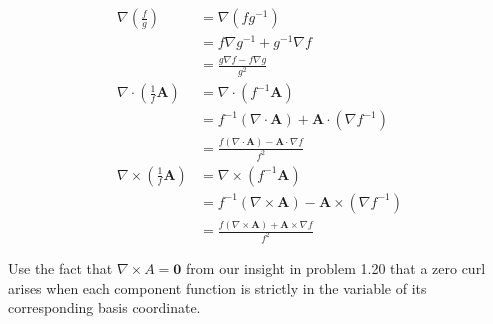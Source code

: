 \documentclass[a4paper]{article}
\begin{document}
\begin{align*}
	\nabla \!\left( \frac{f}{g} \right) & = \nabla \!\left( fg^{-1} \right) \\
					    & = f \nabla g^{-1} + g^{-1}\nabla f \\
					    & = \frac{g \nabla f - f \nabla g}{g^{2}} \\
	\nabla \cdot \!\left( \frac{1}{f} \pmb{A} \right) & = \nabla \cdot \!\left( f^{-1}\pmb{A} \right) \\
							  & = f^{-1}\!\left( \nabla \cdot \pmb{A} \right) + \pmb{A} \cdot \!\left( \nabla f^{-1} \right) \\
							  & = \frac{f \!\left( \nabla \cdot \pmb{A} \right) - \pmb{A} \cdot \nabla f}{f^{2}} \\
	\nabla \times \!\left( \frac{1}{f}\pmb{A} \right) & = \nabla \times \!\left( f^{-1}\pmb{A} \right) \\
							  & = f^{-1}\!\left( \nabla \times \pmb{A} \right) - \pmb{A} \times \!\left( \nabla f^{-1} \right) \\
							  & = \frac{f \!\left( \nabla \times \pmb{A} \right) + \pmb{A} \times \nabla f}{f^{2}}
\end{align*}


Use the fact that \( \nabla \times A = \pmb{0} \) from our insight in problem 1.20 that a zero curl arises when each component function is strictly in the variable of its corresponding basis coordinate.
\end{document}
